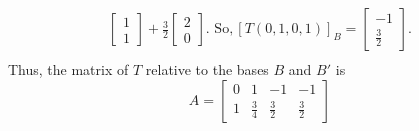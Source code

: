 \documentclass[a4paper,12pt]{article}
\begin{document}
\begin{itemize}
\begin{align*}
\begin{bmatrix}
          1 \\
          1 
        \end{bmatrix} + \frac{3}{2}\begin{bmatrix}
            2\\
            0
        \end{bmatrix}.\text{ So}, [T(0,1,0,1)]_B= \begin{bmatrix}
            -1\\
            \frac{3}{2}
        \end{bmatrix}.\\      
    \end{align*}
Thus, the matrix of $T$ relative to the bases $B$ and $B'$ is
\[A=
\begin{bmatrix}
    0&1&-1&-1\\
    1&\frac{3}{4}&\frac{3}{2}&\frac{3}{2}
\end{bmatrix}
\]
\end{itemize}
\end{document}
